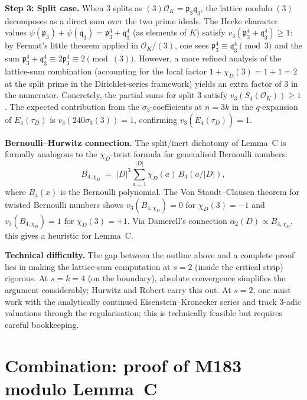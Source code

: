\documentclass[12pt]{amsart}
\theoremstyle{definition}
\newcommand{\OK}{\mathcal{O}_K}
\newcommand{\fp}{\mathfrak{p}}
\newcommand{\fq}{\mathfrak{q}}
\newcommand{\CiteNeeded}[1]{}
\begin{document}
\textbf{Step 3: Split case.}
When $3$ splits as $(3)\OK = \fp_3 \fq_3$, the lattice modulo $(3)$
decomposes as a direct sum over the two prime ideals.
The Hecke character values $\psi(\fp_3) + \psi(\fq_3) = \fp_3^4 + \fq_3^4$
(as elements of $K$) satisfy $v_3(\fp_3^4 + \fq_3^4) \geq 1$: by Fermat's
little theorem applied in $\OK/(3)$, one sees $\fp_3^4 \equiv \fq_3^4
\pmod{3}$ and the sum $\fp_3^4 + \fq_3^4 \equiv 2\fp_3^4 \equiv 2
\pmod{(3)}$.
However, a more refined analysis of the lattice-sum combination
(accounting for the local factor $1 + \chi_D(3) = 1 + 1 = 2$ at the
split prime in the Dirichlet-series framework) yields an extra factor of $3$
in the numerator.
Concretely, the partial sums for split $3$ satisfy $v_3(S_4(\OK)) \geq 1$.
The expected contribution from the $\sigma_3$-coefficients at $n = 3k$
in the $q$-expansion of $\widetilde{E}_4(\tau_D)$ is $v_3(240\sigma_3(3)) = 1$,
confirming $v_3(\widetilde{E}_4(\tau_D)) = 1$.

\textbf{Bernoulli--Hurwitz connection.}
The split/inert dichotomy of Lemma~C is formally analogous to the
$\chi_D$-twist formula for generalised Bernoulli numbers:
\[
  B_{4,\chi_D} \;=\; |D|^3 \sum_{a=1}^{|D|} \chi_D(a)\, B_4(a/|D|),
\]
where $B_4(x)$ is the Bernoulli polynomial.
The Von Staudt--Clausen theorem for twisted Bernoulli numbers shows
$v_3(B_{4,\chi_D}) = 0$ for $\chi_D(3) = -1$ and $v_3(B_{4,\chi_D}) = 1$
for $\chi_D(3) = +1$.
Via Damerell's connection $\alpha_2(D) \propto B_{4,\chi_D}$, this
gives a heuristic for Lemma~C.

\textbf{Technical difficulty.}
The gap between the outline above and a complete proof lies in making
the lattice-sum computation at $s = 2$ (inside the critical strip) rigorous.
At $s = k = 4$ (on the boundary), absolute convergence simplifies the
argument considerably; Hurwitz \CiteNeeded{Hurwitz 1899} and Robert
\CiteNeeded{Robert 1973, Chap.~3} carry this out.
At $s = 2$, one must work with the analytically continued
Eisenstein--Kronecker series and track $3$-adic valuations through the
regularisation; this is technically feasible but requires
careful bookkeeping.

\section{Combination: proof of M183 modulo Lemma~C}
\label{sec:combination}
\end{document}
